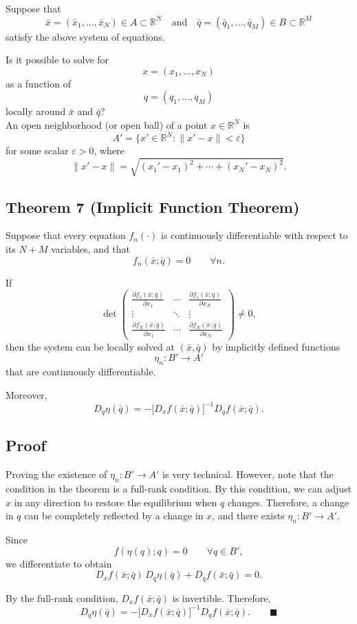 Suppose that
\[
\bar{x}=(\bar{x}_1,\dots,\bar{x}_N)\in A \subset \mathbb{R}^N
\quad \text{and} \quad
\bar q=(\bar q_1,\dots,\bar q_M)\in B \subset \mathbb{R}^M
\]
satisfy the above system of equations.

Is it possible to solve for
\[
{x}=({x}_1,\dots,{x}_N)
\]
as a function of
\[
{q}=({q}_1,\dots,{q}_M)
\]
locally around $\bar x$ and $\bar{q}$?\\

An open neighborhood (or open ball) of a point $x\in\mathbb{R}^N$ is
\[
A'=\{x'\in\mathbb{R}^N:\|x'-x\|<\varepsilon\}
\]
for some scalar $\varepsilon>0$, where
\[
\|x'-x\|
=
\sqrt{(x_1'-x_1)^2+\cdots+(x_N'-x_N)^2}.
\]


\begin{tcolorbox}[breakable, colback=white]
\subsection*{Theorem 7 (Implicit Function Theorem)}

Suppose that every equation $f_n(\cdot)$ is continuously differentiable
with respect to its $N+M$ variables, and that
\[
f_n(\bar{x};\bar q)=0
\qquad \forall n.
\]

If
\[
\det
\begin{pmatrix}
\frac{\partial f_1(\bar{x};\bar q)}{\partial x_1} & \cdots & \frac{\partial f_1(\bar{x};\bar q)}{\partial x_N} \\
\vdots & \ddots & \vdots \\
\frac{\partial f_N(\bar{x};\bar q)}{\partial x_1} & \cdots & \frac{\partial f_N(\bar{x};\bar q)}{\partial x_N}
\end{pmatrix}
\neq 0,
\]
then the system can be locally solved at $(\bar{x},\bar q)$ by implicitly defined
functions
\[
\eta_n : B' \to A'
\]
that are continuously differentiable.

Moreover,
\[
D_q \eta(\bar q)
=
-\bigl[D_x f(\bar{x};\bar q)\bigr]^{-1} D_q f(\bar{x};\bar q).
\]

\subsection*{Proof}

Proving the existence of $\eta_n:B'\to A'$ is very technical.
However, note that the condition in the theorem is a full-rank condition.
By this condition, we can adjust $x$ in any direction to restore the equilibrium
when $q$ changes. Therefore, a change in $q$ can be completely reflected by a
change in $x$, and there exists $\eta_n:B'\to A'$.

Since
\[
f(\eta(q);q)=0
\qquad \forall q\in B',
\]
we differentiate to obtain
\[
D_x f(\bar x;\bar q)\, D_q \eta(\bar q) + D_q f(\bar x;\bar q)=0.
\]

By the full-rank condition, $D_x f(\bar x;\bar q)$ is invertible. Therefore,
\[
D_q \eta(\bar q)
=
-\bigl[D_x f(\bar x;\bar q)\bigr]^{-1} D_q f(\bar x;\bar q).
\qquad \blacksquare
\]

\end{tcolorbox}

